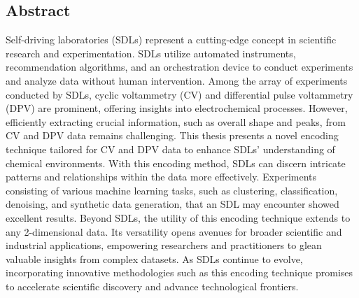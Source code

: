 \begin{center}
\chapter*{\centering Abstract} 
\begin{singlespace}
Self-driving laboratories (SDLs) represent a cutting-edge concept in scientific research and experimentation. SDLs utilize automated instruments, recommendation algorithms, and an orchestration device to conduct experiments and analyze data without human intervention. Among the array of experiments conducted by SDLs, cyclic voltammetry (CV) and differential pulse voltammetry (DPV) are prominent, offering insights into electrochemical processes. However, efficiently extracting crucial information, such as overall shape and peaks, from CV and DPV data remains challenging. This thesis presents a novel encoding technique tailored for CV and DPV data to enhance SDLs' understanding of chemical environments. With this encoding method, SDLs can discern intricate patterns and relationships within the data more effectively. Experiments consisting of various machine learning tasks, such as clustering, classification, denoising, and synthetic data generation, that an SDL may encounter showed excellent results. Beyond SDLs, the utility of this encoding technique extends to any 2-dimensional data. Its versatility opens avenues for broader scientific and industrial applications, empowering researchers and practitioners to glean valuable insights from complex datasets. As SDLs continue to evolve, incorporating innovative methodologies such as this encoding technique promises to accelerate scientific discovery and advance technological frontiers.
\end{singlespace}
\end{center}